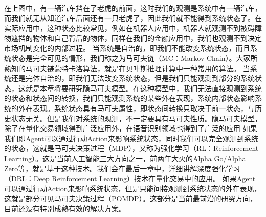 \documentclass{article}
\begin{document}
在上图中，有一辆汽车挡在了老虎的前面，这时我们的观测是系统中有一辆汽车，而我们就无从知道汽车后面还有一只老虎了，因此我们就不能得到系统状态了。在实际应用中，这种状态比较常见，例如在机器人应用中，机器人就观测不到被碍障物遮挡的物体和自己背后的物体，同样在我们的金融应用中，我们也观测不到决定市场机制变化的内部过程。\newline
当系统是自治的，即我们不能改变系统状态，而且系统状态是完全可见的情形，我们称之为马可夫链（MC：Markov Chain）。大家所熟知的马可夫链蒙特卡洛算法，就是在贝叶斯推理计算中一种常用的算法。\newline
当系统还是完体自治的，即我们无法改变系统状态，但是我们只能观测到部分的系统状态，这就是本章将要研究隐马可夫模型。在这种模型中，我们无法直接观测到系统的状态和状态间的转换，我们只能观测系统的某些外在表现，系统内部状态影响系统的外在表现。系统状态具有马可夫属性，即状态间转换只取决于前一状态，与历史状态无关。但是我们对系统的观测，不一定要具有马可夫性质。隐马可夫模型，除了在量化交易领域得到广泛应用外，在语音识别领域也得到了广泛的应用\newline
如果我们即Agent可以通过行动Action来影响系统状态，同时我们可以完全观测到系统的状态，这就是马可夫决策过程（MDP），又称为强化学习（RL：Reinforcement Learning）。这是当前人工智能三大方向之一，前两年大火的Alpha Go/Alpha Zero等，就是基于这种技术。我们会在最后一章中，详细讲解深度强化学习（DRL：Deep Reinforcement Learning）技术在量化交易中的应用。\newline
如果Agent可以通过行动Action来影响系统状态，但是只能间接观测到系统状态的外在表现，这就是部分可见马可夫决策过程（POMDP）。这部分是当前最前沿的研究方向，目前还没有特别成熟有效的解决方案。
\end{document}
